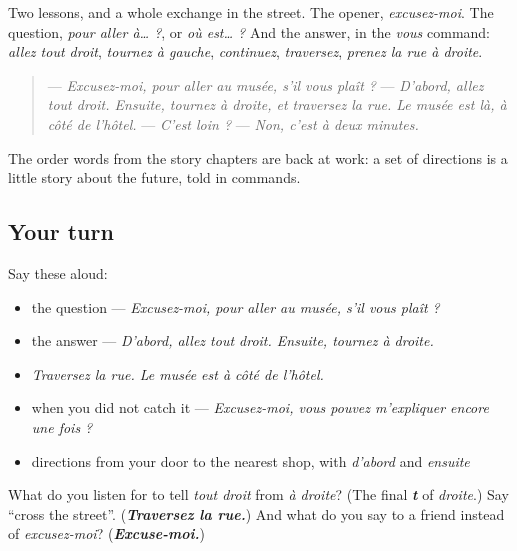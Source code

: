 \begin{grammarlens}[title={What you've built}]
Two lessons, and a whole exchange in the street. The opener, \emph{excusez-moi}. The question, \emph{pour aller à… ?}, or \emph{où est… ?} And the answer, in the \emph{vous} command: \emph{allez tout droit}, \emph{tournez à gauche}, \emph{continuez}, \emph{traversez}, \emph{prenez la rue à droite}.

\begin{quote}
— \emph{Excusez-moi, pour aller au musée, s'il vous plaît ?} — \emph{D'abord, allez tout droit. Ensuite, tournez à droite, et traversez la rue. Le musée est là, à côté de l'hôtel.} — \emph{C'est loin ?} — \emph{Non, c'est à deux minutes.}
\end{quote}

The order words from the story chapters are back at work: a set of directions is a little story about the future, told in commands.
\end{grammarlens}

\subsection*{Your turn}
Say these aloud:

\begin{itemize}
\raggedright
  \item the question — \emph{Excusez-moi, pour aller au musée, s'il vous plaît ?}
  \item the answer — \emph{D'abord, allez tout droit. Ensuite, tournez à droite.}
  \item \emph{Traversez la rue. Le musée est à côté de l'hôtel.}
  \item when you did not catch it — \emph{Excusez-moi, vous pouvez m'expliquer encore une fois ?}
  \item directions from your door to the nearest shop, with \emph{d'abord} and \emph{ensuite}
\end{itemize}

\begin{tcolorbox}[breakable,colback=teal!4,colframe=teal!35!black,title={Before you move on}]
What do you listen for to tell \emph{tout droit} from \emph{à droite}? (The final \emph{\textbf{t}} of \emph{droite}.) Say \textquotedblleft{}cross the street\textquotedblright{}. (\emph{\textbf{Traversez la rue.}}) And what do you say to a friend instead of \emph{excusez-moi}? (\emph{\textbf{Excuse-moi.}})
\end{tcolorbox}
